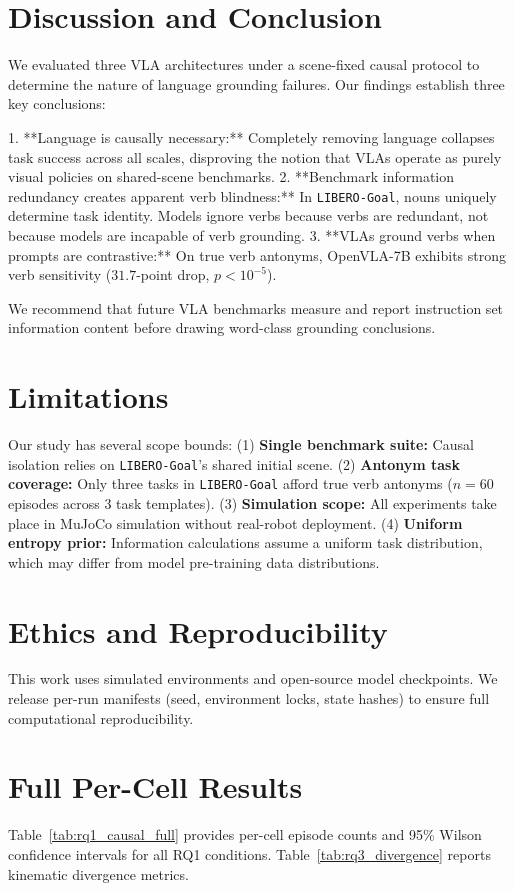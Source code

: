 \documentclass[11pt]{article}
\begin{document}
\section{Discussion and Conclusion}
We evaluated three VLA architectures under a scene-fixed causal protocol to determine the nature of language grounding failures. Our findings establish three key conclusions:

1. **Language is causally necessary:** Completely removing language collapses task success across all scales, disproving the notion that VLAs operate as purely visual policies on shared-scene benchmarks.
2. **Benchmark information redundancy creates apparent verb blindness:** In \texttt{LIBERO-Goal}, nouns uniquely determine task identity. Models ignore verbs because verbs are redundant, not because models are incapable of verb grounding.
3. **VLAs ground verbs when prompts are contrastive:** On true verb antonyms, OpenVLA-7B exhibits strong verb sensitivity ($31.7$-point drop, $p<10^{-5}$).

We recommend that future VLA benchmarks measure and report instruction set information content before drawing word-class grounding conclusions.

\section*{Limitations}
Our study has several scope bounds: (1) \textbf{Single benchmark suite:} Causal isolation relies on \texttt{LIBERO-Goal}'s shared initial scene. (2) \textbf{Antonym task coverage:} Only three tasks in \texttt{LIBERO-Goal} afford true verb antonyms ($n=60$ episodes across 3 task templates). (3) \textbf{Simulation scope:} All experiments take place in MuJoCo simulation without real-robot deployment. (4) \textbf{Uniform entropy prior:} Information calculations assume a uniform task distribution, which may differ from model pre-training data distributions.

\section*{Ethics and Reproducibility}
This work uses simulated environments and open-source model checkpoints. We release per-run manifests (seed, environment locks, state hashes) to ensure full computational reproducibility.




\appendix

\section{Full Per-Cell Results}
\label{app:full}
Table~\ref{tab:rq1_causal_full} provides per-cell episode counts and 95\% Wilson confidence intervals for all RQ1 conditions. Table~\ref{tab:rq3_divergence} reports kinematic divergence metrics.
\end{document}
